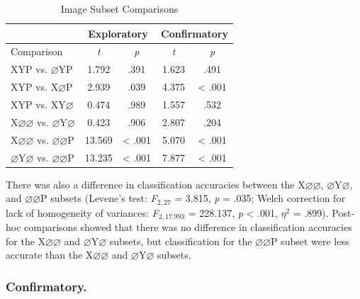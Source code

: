 \documentclass[
  english,
  man, donotrepeattitle,floatsintext]{apa6}
\begin{document}
\begin{table}[!h]
    \centering
    \caption{Image Subset Comparisons}
    \label{tab:image-parcellation-comparisons}
    \begin{tabular}{l c c c c}
         & \multicolumn{2}{c}{Exploratory} & \multicolumn{2}{c}{Confirmatory} \\
        \hline
        Comparison & \textit{t} & \multicolumn{1}{c|}{\textit{p}} & \textit{t} & \textit{p} \\
        \hline
        XYP vs. $\varnothing$YP & 1.792 & \multicolumn{1}{c|}{.391} & 1.623 & .491 \\
        XYP vs. X$\varnothing$P & 2.939 & \multicolumn{1}{c|}{.039} & 4.375 & < .001 \\
        XYP vs. XY$\varnothing$ & 0.474 & \multicolumn{1}{c|}{.989} & 1.557 & .532 \\
        X$\varnothing\varnothing$ vs. $\varnothing$Y$\varnothing$ & 0.423 & \multicolumn{1}{c|}{.906} & 2.807 & .204 \\
        X$\varnothing\varnothing$ vs. $\varnothing\varnothing$P & 13.569 & \multicolumn{1}{c|}{< .001} & 5.070 & < .001 \\
        $\varnothing$Y$\varnothing$ vs. $\varnothing\varnothing$P & 13.235 & \multicolumn{1}{c|}{< .001} & 7.877 & < .001 \\
        \hline
    \end{tabular}
\end{table}

There was also a difference in classification accuracies between the X\(\varnothing\varnothing\), \(\varnothing\)Y\(\varnothing\), and \(\varnothing\varnothing\)P subsets (Levene's test: \emph{F}\(_{2, 27}\) = 3.815, \emph{p} = .035; Welch correction for lack of homogeneity of variances: \emph{F}\(_{2, 17.993}\) = 228.137, \emph{p} \textless{} .001, \textit{$\eta$}\(^{2}\) = .899). Post-hoc comparisons showed that there was no difference in classification accuracies for the X\(\varnothing\varnothing\) and \(\varnothing\)Y\(\varnothing\) subsets, but classification for the \(\varnothing\varnothing\)P subset were less accurate than the X\(\varnothing\varnothing\) and \(\varnothing\)Y\(\varnothing\) subsets.

\subsubsection{Confirmatory.}
\end{document}

